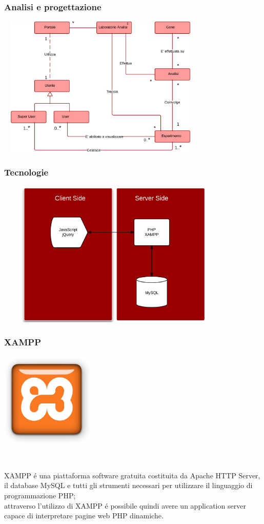 \documentclass[hyperref={pdfpagelabels=false}]{beamer}
\begin{document}
\begin{frame}\frametitle{Analisi e progettazione}
\includegraphics[width=10cm,height=6.75cm]{uml.png}
\end{frame}

\begin{frame}\frametitle{Tecnologie}
\includegraphics[width=11.25cm,height=7cm]{tecnologie.png}
\end{frame}

\begin{frame}\frametitle{XAMPP}
\begin{minipage}[c]{.4\textwidth}
	\includegraphics[width=4.5cm,height=4.5cm]{xampp.png}
\end{minipage}%
\
\begin{minipage}[c]{.55\textwidth}
	XAMPP \'e una piattaforma software gratuita costituita da Apache HTTP Server, il database MySQL e tutti gli strumenti necessari per utilizzare il linguaggio di programmazione PHP;\\
	attraverso l'utilizzo di XAMPP \'e possibile quindi avere un application server capace di interpretare pagine web PHP dinamiche.
\end{minipage}
\end{frame}
\end{document}
